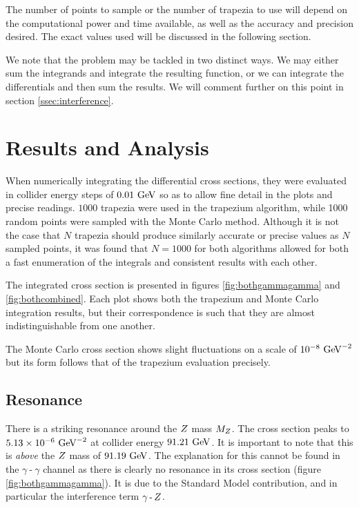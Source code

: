 \documentclass[]{article}
\providecommand{\e}[1]{\ensuremath{\times 10^{#1}}}
\begin{document}
The number of points to sample or the number of trapezia to use will depend on the computational power and time available, as well as the accuracy and precision desired. The exact values used will be discussed in the following section.

We note that the problem may be tackled in two distinct ways. We may either sum the integrands and integrate the resulting function, or we can integrate the differentials and then sum the results. We will comment further on this point in section \ref{ssec:interference}.


\section{Results and Analysis}\label{sec:results}

When numerically integrating the differential cross sections, they were evaluated in collider energy steps of $0.01\GeV$ so as to allow fine detail in the plots and precise readings. $1000$ trapezia were used in the trapezium algorithm, while 1000 random points were sampled with the Monte Carlo method. Although it is not the case that $N$ trapezia should produce similarly accurate or precise values as $N$ sampled points, it was found that $N=1000$ for both algorithms allowed for both a fast enumeration of the integrals and consistent results with each other.

The integrated cross section is presented in figures \ref{fig:bothgammagamma} and \ref{fig:bothcombined}. Each plot shows both the trapezium and Monte Carlo integration results, but their correspondence is such that they are almost indistinguishable from one another.

The Monte Carlo cross section shows slight fluctuations on a scale of $10^{-8}\GeV^{-2}$ but its form follows that of the trapezium evaluation precisely.

\subsection{Resonance}\label{ssec:resonance}

There is a striking resonance around the $Z $ mass $M_{Z }$. The cross section peaks to $5.13\e{-6}\GeV^{-2}$ at collider energy $91.21\GeV$. It is important to note that this is \emph{above} the $Z $ mass of $91.19\GeV$. The explanation for this cannot be found in the $\gamma\operatorname{-}\gamma$ channel as there is clearly no resonance in its cross section (figure \ref{fig:bothgammagamma}). It is due to the Standard Model contribution, and in particular the interference term $\gamma\operatorname{-}Z $.
\end{document}

